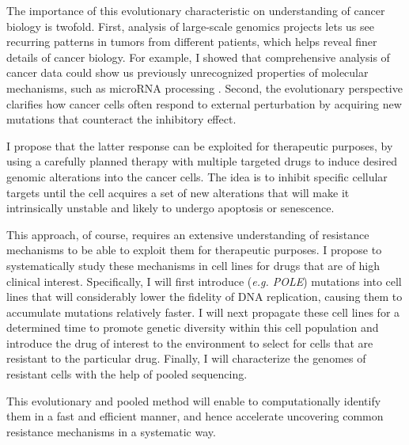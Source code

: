 \documentclass[11pt,letterpaper]{article}
\begin{document}
The importance of this evolutionary characteristic on understanding of cancer biology is twofold.
First, analysis of large-scale genomics projects lets us see recurring patterns in tumors from different patients, which helps reveal finer details of cancer biology.
For example, I showed that comprehensive analysis of cancer data could show us previously unrecognized properties of molecular mechanisms, such as microRNA processing \cite{aksoy2014cancer}.
Second, the evolutionary perspective clarifies how cancer cells often respond to external perturbation by acquiring new mutations that counteract the inhibitory effect.

I propose that the latter response can be exploited for therapeutic purposes,
by using a carefully planned therapy with multiple targeted drugs to induce desired genomic alterations into the cancer cells.
The idea is to inhibit specific cellular targets until the cell acquires a set of new alterations that will make it intrinsically unstable and likely to undergo apoptosis or senescence.

This approach, of course, requires an extensive understanding of resistance mechanisms to be able to exploit them for therapeutic purposes.
I propose to systematically study these mechanisms in cell lines for drugs that are of high clinical interest.
Specifically, I will first introduce (\textit{e.g. POLE}) mutations into cell lines that will considerably lower the fidelity of DNA replication,
causing them to accumulate mutations relatively faster.
I will next propagate these cell lines for a determined time to promote genetic diversity within this cell population
and introduce the drug of interest to the environment to select for cells that are resistant to the particular drug.
Finally, I will characterize the genomes of resistant cells with the help of pooled sequencing.

This evolutionary and pooled method will enable to computationally identify them in a fast and efficient manner,
and hence accelerate uncovering common resistance mechanisms in a systematic way.

\clearpage

\footnotesize{
{}
}
\end{document}
